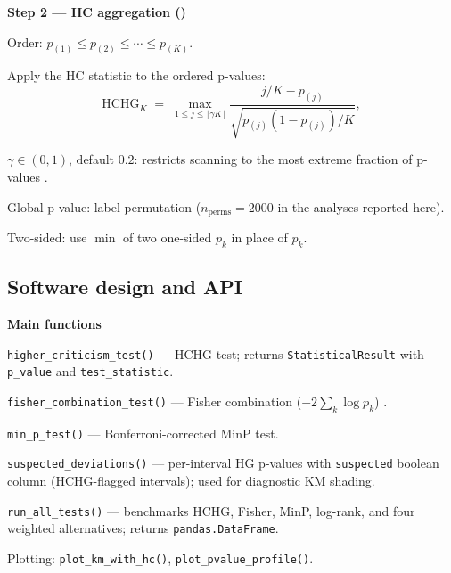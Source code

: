 \documentclass[unnumsec,webpdf,contemporary,large]{oup-authoring-template}
\let\origitemize\itemize
\let\origenditemize\enditemize
\renewenvironment{itemize}{%
  \origitemize
  \setlength{\itemsep}{1pt}%
  \setlength{\parskip}{0pt}%
  \setlength{\topsep}{3pt}%
}{\origenditemize}
\begin{document}
\textbf{Step 2 — HC aggregation (\citealt{donoho2004})}
\begin{itemize}
  \item Order: $p_{(1)} \leq p_{(2)} \leq \cdots \leq p_{(K)}$.
  \item Apply the HC statistic to the ordered p-values:
\end{itemize}
%
\begin{equation}\label{eq:hc}
  \mathrm{HCHG}_K
  \;=\;
  \max_{1 \leq j \leq \lfloor\gamma K\rfloor}
  \frac{j/K - p_{(j)}}{\sqrt{p_{(j)}\!\left(1 - p_{(j)}\right)/K}},
\end{equation}
%
\begin{itemize}
  \item $\gamma \in (0,1)$, default $0.2$: restricts scanning to the
        most extreme fraction of p-values \citep{donoho2004}.
  \item Global p-value: label permutation ($n_\mathrm{perms}=2000$
        in the analyses reported here).
  \item Two-sided: use $\min$ of two one-sided $p_k$ in place of $p_k$.
\end{itemize}


\subsection*{Software design and API}

\textbf{Main functions}
\begin{itemize}
  \item \texttt{higher\_criticism\_test()} — HCHG test; returns
        \texttt{StatisticalResult} with \texttt{p\_value} and
        \texttt{test\_statistic}.
  \item \texttt{fisher\_combination\_test()} — Fisher combination
        ($-2\sum_k \log p_k$) \citep{fisher1932}.
  \item \texttt{min\_p\_test()} — Bonferroni-corrected MinP test.
  \item \texttt{suspected\_deviations()} — per-interval HG p-values
        with \texttt{suspected} boolean column (HCHG-flagged intervals);
        used for diagnostic KM shading.
  \item \texttt{run\_all\_tests()} — benchmarks HCHG, Fisher, MinP,
        log-rank, and four weighted alternatives; returns
        \texttt{pandas.DataFrame}.
  \item Plotting: \texttt{plot\_km\_with\_hc()},
        \texttt{plot\_pvalue\_profile()}.
\end{itemize}
\end{document}
